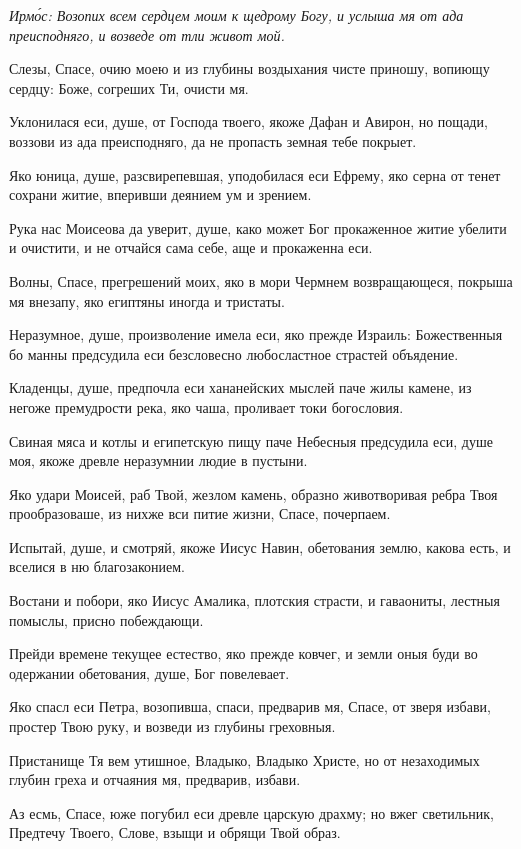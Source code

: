 \itshape Ирм\'{о}с\normalfont{}: Возопих всем сердцем моим к щедрому Богу, и услыша мя от ада преисподняго, и возведе от тли живот мой.

Слезы, Спасе, очию моею и из глубины воздыхания чисте приношу, вопиющу сердцу: Боже, согреших Ти, очисти мя.

Уклонилася еси, душе, от Господа твоего, якоже Дафан и Авирон, но пощади, воззови из ада преисподняго, да не пропасть земная тебе покрыет.

Яко юница, душе, разсвирепевшая, уподобилася еси Ефрему, яко серна от тенет сохрани житие, вперивши деянием ум и зрением.

Рука нас Моисеова да уверит, душе, како может Бог прокаженное житие убелити и очистити, и не отчайся сама себе, аще и прокаженна еси.

Волны, Спасе, прегрешений моих, яко в мори Чермнем возвращающеся, покрыша мя внезапу, яко египтяны иногда и тристаты.

Неразумное, душе, произволение имела еси, яко прежде Израиль: Божественныя бо манны предсудила еси безсловесно любосластное страстей объядение.

Кладенцы, душе, предпочла еси хананейских мыслей паче жилы камене, из негоже премудрости река, яко чаша, проливает токи богословия.

Свиная мяса и котлы и египетскую пищу паче Небесныя предсудила еси, душе моя, якоже древле неразумнии людие в пустыни.

Яко удари Моисей, раб Твой, жезлом камень, образно животворивая ребра Твоя прообразоваше, из нихже вси питие жизни, Спасе, почерпаем.

Испытай, душе, и смотряй, якоже Иисус Навин, обетования землю, какова есть, и вселися в ню благозаконием.

Востани и побори, яко Иисус Амалика, плотския страсти, и гаваониты, лестныя помыслы, присно побеждающи.

Прейди времене текущее естество, яко прежде ковчег, и земли оныя буди во одержании обетования, душе, Бог повелевает.

Яко спасл еси Петра, возопивша, спаси, предварив мя, Спасе, от зверя избави, простер Твою руку, и возведи из глубины греховныя.

Пристанище Тя вем утишное, Владыко, Владыко Христе, но от незаходимых глубин греха и отчаяния мя, предварив, избави.

Аз есмь, Спасе, юже погубил еси древле царскую драхму; но вжег светильник, Предтечу Твоего, Слове, взыщи и обрящи Твой образ.

